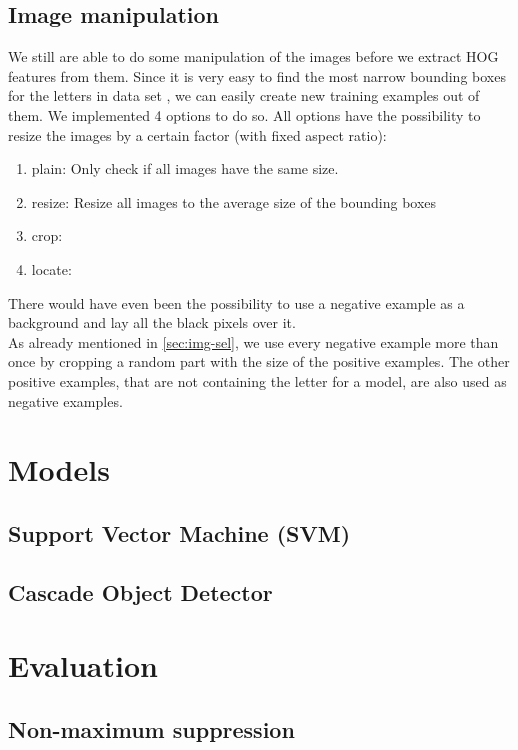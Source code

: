 \documentclass[conference]{IEEEtran}
\begin{document}
\subsection{Image manipulation}

We still are able to do some manipulation of the images before we extract HOG features from them. Since it is very easy to find the most narrow bounding boxes for the letters in data set \cite{bib:chars74k}, we can easily create new training examples out of them. We implemented 4 options to do so. All options have the possibility to resize the images by a certain factor (with fixed aspect ratio):
\begin{enumerate}
\item plain: Only check if all images have the same size.
\item resize: Resize all images to the average size of the bounding boxes
\item crop:
\item locate:
\end{enumerate}
There would have even been the possibility to use a negative example as a background and lay all the black pixels over it. \\[-5pt]

As already mentioned in \ref{sec:img-sel}, we use every negative example more than once by cropping a random part with the size of the positive examples. The other positive examples, that are not containing the letter for a model, are also used as negative examples.

\section{Models}

\subsection{Support Vector Machine (SVM)}

\subsection{Cascade Object Detector}

\section{Evaluation}

\subsection{Non-maximum suppression}
\end{document}
